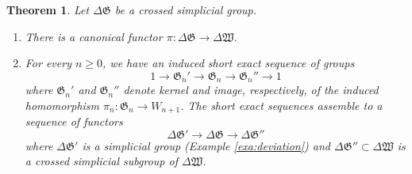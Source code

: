 \documentclass[english,11pt,leqno]{article}
\def\Gen{\mathfrak{G}}
\def\lra{\longrightarrow}
\def\DG{ {\Delta \Gen}}
\def\DW{ {\Delta {\mathfrak W}}}
\newtheorem{thm}{Theorem}[section]
\theoremstyle{definition}
\theoremstyle{remark}
\numberwithin{equation}{section}
\begin{document}
\begin{thm}\label{thm:classification} Let $\DG$ be a crossed simplicial group.
\begin{enumerate}
	\item There is a canonical functor $\pi: \DG \to \DW$.
	\item For every $n \ge 0$, we have an induced short exact sequence of groups
		\[
			1 \lra \Gen_n' \lra \Gen_n \lra \Gen_n'' \lra 1
		\]
	      where $\Gen_n'$ and $\Gen_n''$ denote kernel and image, respectively, of the induced
	      homomorphism $\pi_n: \Gen_n \to W_{n+1}$. The short exact sequences assemble to a
	      sequence of functors
	      \[
			\DG' \lra \DG \lra \DG'' 
	      \]
	      where $\DG'$ is a simplicial group (Example \ref{exa:deviation}) and $\DG'' \subset \DW$ is a crossed
	      simplicial subgroup of $\DW$.
\end{enumerate}
\end{thm}
\end{document}
